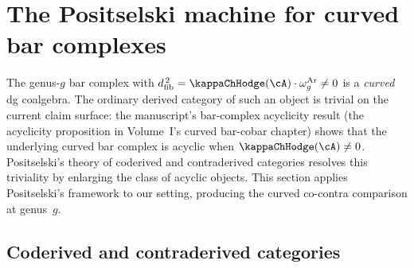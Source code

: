 \section{The Positselski machine for curved bar complexes}
\label{sec:positselski-machine}

\providecommand{\Dco}{\mathsf{D}^{\mathrm{co}}}
\providecommand{\Dctr}{\mathsf{D}^{\mathrm{ctr}}}
\providecommand{\Hot}{\mathsf{Hot}}
\providecommand{\Acyclco}{\mathsf{Acycl}^{\mathrm{co}}}

The genus-$g$ bar complex with $\dfib^{\,2} = \kappaChHodge(\cA) \cdot \omega_g^{\mathrm{Ar}}
\neq 0$ is a \emph{curved} dg coalgebra. The ordinary derived
category of such an object is trivial on the current claim surface:
the manuscript's bar-complex acyclicity result
\textup{(}the acyclicity proposition in Volume~I's curved bar-cobar
chapter\textup{)}
shows that the underlying curved bar complex is acyclic when
$\kappaChHodge(\cA) \neq 0$.
Positselski's theory of coderived and contraderived categories
\cite{Pos11} resolves this triviality by enlarging the class of
acyclic objects. This section applies Positselski's framework to
our setting, producing the curved co-contra comparison at genus~$g$.

\subsection{Coderived and contraderived categories}
\label{subsec:coderived-contraderived}

